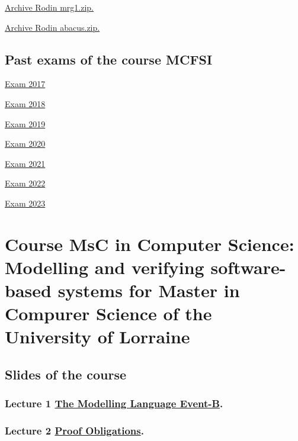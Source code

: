 \documentclass[ 12pt]{article}
\begin{document}
\href{http://mery54.github.io/teaching/mosos/models/mrg1.zip}{Archive 
  Rodin  mrg1.zip.}

\href{http://mery54.github.io/teaching/mosos/models/abacus.zip}{Archive 
  Rodin  abacus.zip.}


\subsection{Past exams  of  the course MCFSI}
\label{sec:past-exams-course}


\href{http://mery54.github.io/teaching/mosos/lecturesnotes/exam2017.pdf}{Exam   2017}


\href{http://mery54.github.io/teaching/mosos/lecturesnotes/exam2018.pdf}{Exam   2018}


\href{http://mery54.github.io/teaching/mosos/lecturesnotes/exam2019.pdf}{Exam   2019}

\href{http://mery54.github.io/teaching/mosos/lecturesnotes/exam2020.pdf}{Exam   2020}

\href{http://mery54.github.io/teaching/mosos/lecturesnotes/exam2021.pdf}{Exam   2021}


\href{http://mery54.github.io/teaching/mosos/lecturesnotes/exam2022.pdf}{Exam   2022}


\href{http://mery54.github.io/teaching/mosos/lecturesnotes/exam2023.pdf}{Exam 
  2023}


\hrulefill






\section{Course  MsC in Computer Science:  Modelling and verifying software-based systems for
  Master in Compurer Science of the University of Lorraine}
\label{sec:course-modell-verify}


\subsection{Slides of the course}
\label{sec:slides-course}

\subsubsection{Lecture 1 
  \href{http://mery54.github.io/teaching/mosos/lecturesnotes/masterillect1-1.pdf}{The 
    Modelling Language Event-B}.}

  
\subsubsection{ Lecture 2 
    \href{http://mery54.github.io/teaching/mosos/lecturesnotes/masterillect1-2.pdf}{Proof 
      Obligations}.}
\end{document}
